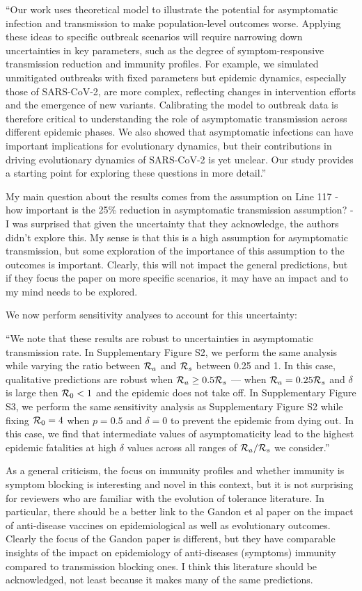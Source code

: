\documentclass[12pt]{article}
\newcommand{\RR}{\ensuremath{{\cal R}}}
\newcommand{\revtext}{\textsf}
\begin{document}
``Our work uses theoretical model to illustrate the potential for asymptomatic infection and transmission to make population-level outcomes worse.
Applying these ideas to specific outbreak scenarios will require narrowing down uncertainties in key parameters, such as the degree of symptom-responsive transmission reduction and immunity profiles.
For example, we simulated unmitigated outbreaks with fixed parameters but epidemic dynamics, especially those of SARS-CoV-2, are more complex, reflecting changes in intervention efforts and the emergence of new variants.
Calibrating the model to outbreak data is therefore critical to understanding the role of asymptomatic transmission across different epidemic phases.
We also showed that asymptomatic infections can have important implications for evolutionary dynamics, but their contributions in driving evolutionary dynamics of SARS-CoV-2 is yet unclear.
Our study provides a starting point for exploring these questions in more detail.''

\revtext{My main question about the results comes from the assumption on Line 117 - how important is the 25\% reduction in asymptomatic transmission assumption? - I was surprised that given the uncertainty that they acknowledge, the authors didn't explore this. My sense is that this is a high assumption for asymptomatic transmission, but some exploration of the importance of this assumption to the outcomes is important. Clearly, this will not impact the general predictions, but if they focus the paper on more specific scenarios, it may have an impact and to my mind needs to be explored.}

We now perform sensitivity analyses to account for this uncertainty:

``We note that these results are robust to uncertainties in asymptomatic transmission rate.
In Supplementary Figure S2, we perform the same analysis while varying the ratio between $\RR_a$ and $\RR_s$ between 0.25 and 1.
In this case, qualitative predictions are robust when $\RR_a \geq 0.5 \RR_s$
--- when $\RR_a = 0.25 \RR_s$ and $\delta$ is large then $\RR_0 < 1$ and the epidemic does not take off.
In Supplementary Figure S3, we perform the same sensitivity analysis as Supplementary Figure S2 while fixing $\RR_0 = 4$ when $p=0.5$ and $\delta=0$ to prevent the epidemic from dying out. In this case, we find that intermediate values of asymptomaticity lead to the highest epidemic fatalities at high $\delta$ values across all ranges of $\RR_a/\RR_s$ we consider.''

\revtext{As a general criticism, the focus on immunity profiles and whether immunity is symptom blocking is interesting and novel in this context, but it is not surprising for reviewers who are familiar with the evolution of tolerance literature. In particular, there should be a better link to the Gandon et al paper on the impact of anti-disease vaccines on epidemiological as well as evolutionary outcomes. Clearly the focus of the Gandon paper is different, but they have comparable insights of the impact on epidemiology of anti-diseases (symptoms) immunity compared to transmission blocking ones. I think this literature should be acknowledged, not least because it makes many of the same predictions.}
\end{document}
